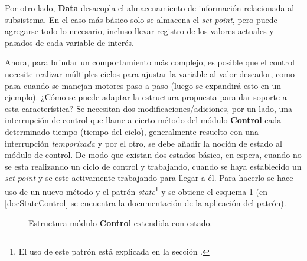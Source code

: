 Por otro lado, \textbf{Data} desacopla el almacenamiento de información relacionada al subsistema. En el caso más básico solo se almacena el \textit{set-point}, pero puede agregarse todo lo necesario, incluso llevar registro de los valores actuales y pasados de cada variable de interés.

Ahora, para brindar un comportamiento más complejo, es posible que el control necesite realizar múltiples ciclos para ajustar la variable al valor deseador, como pasa cuando se manejan motores paso a paso (luego se expandirá esto en un ejemplo). ¿Cómo se puede adaptar la estructura propuesta para dar soporte a esta característica? Se necesitan dos modificaciones/adiciones, por un lado, una interrupción de control que llame a cierto método del módulo \textbf{Control} cada determinado tiempo (tiempo del ciclo), generalmente resuelto con una interrupción \textit{temporizada} y por el otro, se debe añadir la noción de estado al módulo de control. De modo que existan dos estados básico, en espera, cuando no se esta realizando un ciclo de control y trabajando, cuando se haya establecido un \textit{set-point} y se este activamente trabajando para llegar a él. Para hacerlo se hace uso de un nuevo método y el patrón \textit{state}\footnote{El uso de este patrón está explicada en la sección .} y se obtiene el esquema \ref{controlState} (en \ref{docStateControl} se encuentra la documentación de la aplicación del patrón).

\begin{figure}[H]
\caption{Estructura módulo \textbf{Control} extendida con estado.}
\label{controlState}
\begin{center}
\end{center}
\end{figure}

